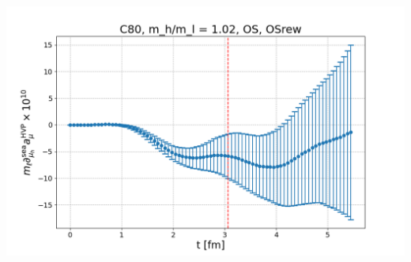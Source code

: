 \documentclass[xcolor={dvipsnames,table}]{beamer}
\begin{document}
\begin{frame}
\begin{columns}
\begin{column}{0.5\textwidth}
      \includegraphics[trim=0cm 0.3cm 0cm 1.2cm, clip,width=\textwidth]{plots/der_mq_sea_lore/amu_C80_OS_der_001ml.png}
    \end{column}
  \end{columns}
\end{frame}
\end{document}
